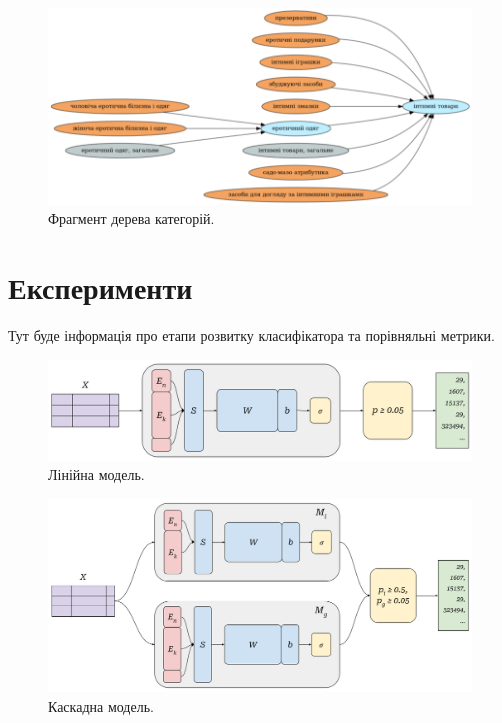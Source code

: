 \documentclass[fleqn,12pt,a4paper]{report}
\theoremstyle{plain}
\theoremstyle{definition}
\numberwithin{equation}{chapter}
\numberwithin{figure}{chapter}
\numberwithin{table}{chapter}
\numberwithin{footnote}{chapter}
\numberwithin{figure}{chapter}
\numberwithin{theorem}{chapter}
\numberwithin{definition}{chapter}
\begin{document}
    \noindent
    \begin{figure}[ht]
        \includegraphics[width=\textwidth]{images/catify-category-tree}
        \caption{Фрагмент дерева категорій.}
    \end{figure}

    \newpage


    \section{Експерименти}\label{sec:section1.4}

    Тут буде інформація про етапи розвитку класифікатора та порівняльні метрики.

    \noindent
    \begin{figure}[ht]
        \includegraphics[width=\textwidth]{images/catify-linear-model}
        \caption{Лінійна модель.}
    \end{figure}

    \noindent
    \begin{figure}[ht]
        \includegraphics[width=\textwidth]{images/catify-cascading-model}
        \caption{Каскадна модель.}
    \end{figure}
\end{document}
